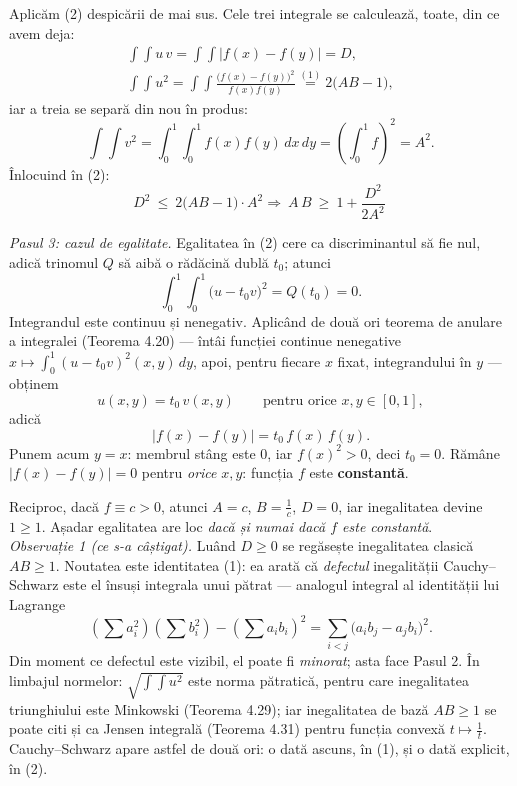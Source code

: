 Aplicăm (2) despicării de mai sus. Cele trei integrale se calculează, toate, din ce avem deja:
\[ \begin{gathered} \int\!\!\int u\,v=\int\!\!\int\bigl|f(x)-f(y)\bigr|=D,\\ \int\!\!\int u^{2}=\int\!\!\int\frac{\bigl(f(x)-f(y)\bigr)^{2}}{f(x)f(y)}\overset{(1)}{=}2\bigl(AB-1\bigr) , \end{gathered} \]
iar a treia se separă din nou în produs:
\[ \int\!\!\int v^{2}=\int_{0}^{1}\!\!\int_{0}^{1}f(x)f(y)\,dx\,dy=\left(\int_{0}^{1}f\right)^{2}=A^{2} . \]
Înlocuind în (2):
\[ D^{2}\ \le\ 2\bigl(AB-1\bigr)\cdot A^{2} \Longrightarrow \boxed{\ A\,B\ \ge\ 1+\frac{D^{2}}{2A^{2}}\ } \]

\emph{Pasul 3: cazul de egalitate.} Egalitatea în (2) cere ca discriminantul să fie nul, adică trinomul $Q$ să aibă o rădăcină dublă $t_{0}$; atunci
\[ \int_{0}^{1}\!\!\int_{0}^{1}\bigl(u-t_{0}v\bigr)^{2}=Q(t_{0})=0 . \]
Integrandul este continuu și nenegativ. Aplicând de două ori teorema de anulare a integralei (Teorema 4.20) --- întâi funcției continue nenegative $x\mapsto\int_{0}^{1}(u-t_{0}v)^{2}(x,y)\,dy$, apoi, pentru fiecare $x$ fixat, integrandului în $y$ --- obținem
\[ u(x,y)=t_{0}\,v(x,y)\qquad\text{pentru orice }x,y\in[0,1] , \]
adică
\[ \bigl|f(x)-f(y)\bigr|=t_{0}\,f(x)\,f(y) . \]
Punem acum $y=x$: membrul stâng este $0$, iar $f(x)^{2}>0$, deci $t_{0}=0$. Rămâne $\bigl|f(x)-f(y)\bigr|=0$ pentru \emph{orice} $x,y$: funcția $f$ este \textbf{constantă}.

Reciproc, dacă $f\equiv c>0$, atunci $A=c$, $B=\frac1c$, $D=0$, iar inegalitatea devine $1\ge1$. Așadar egalitatea are loc \emph{dacă și numai dacă $f$ este constantă}.\\[2pt]
\emph{Observație 1 (ce s-a câștigat).} Luând $D\ge0$ se regăsește inegalitatea clasică $AB\ge1$. Noutatea este identitatea (1): ea arată că \emph{defectul} inegalității Cauchy--Schwarz este el însuși integrala unui pătrat --- analogul integral al identității lui Lagrange
\[ \left(\sum a_{i}^{2}\right)\left(\sum b_{i}^{2}\right)-\left(\sum a_{i}b_{i}\right)^{2}=\sum_{i<j}\bigl(a_{i}b_{j}-a_{j}b_{i}\bigr)^{2} . \]
Din moment ce defectul este vizibil, el poate fi \emph{minorat}; asta face Pasul 2. În limbajul normelor: $\sqrt{\int\!\int u^{2}}$ este norma pătratică, pentru care inegalitatea triunghiului este Minkowski (Teorema 4.29); iar inegalitatea de bază $AB\ge1$ se poate citi și ca Jensen integrală (Teorema 4.31) pentru funcția convexă $t\mapsto\frac1t$. Cauchy--Schwarz apare astfel de două ori: o dată ascuns, în (1), și o dată explicit, în (2).

